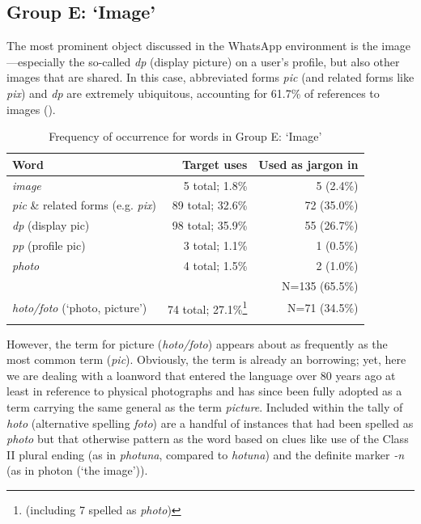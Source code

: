 \documentclass[output=paper
,newtxmath
,modfonts
,nonflat]{langsci/langscibook}
\begin{document}
\subsection{Group E: ‘Image’}

The most prominent object discussed in the WhatsApp environment is the image—especially the so-called \textit{dp} (display picture) on a user’s profile, but also other images that are shared. In this case, abbreviated  forms \textit{pic} (and related forms like \textit{pix}) and \textit{dp} are extremely ubiquitous, accounting for 61.7\% of references to images ().

\begin{table}
\begin{tabularx}{\textwidth}{Qrr}
\lsptoprule
 Word & Target uses &  Used as jargon in \\
\midrule
\textit{image}                                    & 5 total; 1.8\%   & 5 (2.4\%)\\
\textit{pic} \& related forms (e.g. \textit{pix}) & 89 total; 32.6\% & 72 (35.0\%)\\
\textit{dp} (display pic)                         & 98 total; 35.9\% & 55 (26.7\%)\\
\textit{pp} (profile pic)                         & 3 total; 1.1\%   & 1 (0.5\%)\\
\textit{photo}                                    & 4 total; 1.5\%   & 2 (1.0\%)\\\midrule
& & N=135 (65.5\%)\\\midrule
\textit{hoto/foto}  (‘photo, picture’) & 74 total; 27.1\%\footnote{(including 7 spelled as \textit{photo})} & N=71 (34.5\%)\\
\lspbottomrule
\end{tabularx}
\caption{Frequency of occurrence for words in Group E: ‘Image’}
\label{tab:purvis:7}
\end{table} 

However, the  term for picture (\textit{hoto/foto}) appears about as frequently as the most common  term (\textit{pic}). Obviously, the  term is already an  borrowing; yet, here we are dealing with a loanword that entered the  language over 80 years ago at least \citep{bargery1934} in reference to physical photographs and has since been fully adopted as a  term carrying the same general  as the  term \textit{picture}. Included within the tally of  \textit{hoto} (alternative spelling \textit{foto}) are a handful of instances that had been spelled as \textit{photo} but that otherwise pattern as the  word based on clues like use of the Class II plural ending (as in \textit{photuna}, compared to \textit{hotuna}) and the definite marker \textit{{}-n} (as in photon (‘the image’)).
\end{document}
